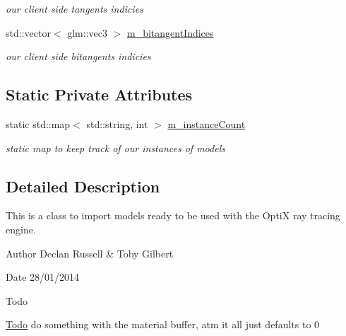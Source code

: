 \begin{DoxyCompactItemize}
\begin{DoxyCompactList}\small\item\em our client side tangents indicies \end{DoxyCompactList}\item 
\hypertarget{class_opti_x_model_a1b7e646a331010d59c0628a857b24a7b}{std\-::vector$<$ glm\-::vec3 $>$ \hyperlink{class_opti_x_model_a1b7e646a331010d59c0628a857b24a7b}{m\-\_\-bitangent\-Indices}}\label{class_opti_x_model_a1b7e646a331010d59c0628a857b24a7b}

\begin{DoxyCompactList}\small\item\em our client side bitangents indicies \end{DoxyCompactList}\end{DoxyCompactItemize}
\subsection*{Static Private Attributes}
\begin{DoxyCompactItemize}
\item 
\hypertarget{class_opti_x_model_ab64b58ae7b33fdc1f9728baeab01e11a}{static std\-::map$<$ std\-::string, int $>$ \hyperlink{class_opti_x_model_ab64b58ae7b33fdc1f9728baeab01e11a}{m\-\_\-instance\-Count}}\label{class_opti_x_model_ab64b58ae7b33fdc1f9728baeab01e11a}

\begin{DoxyCompactList}\small\item\em static map to keep track of our instances of models \end{DoxyCompactList}\end{DoxyCompactItemize}


\subsection{Detailed Description}
This is a class to import models ready to be used with the Opti\-X ray tracing engine. 

\begin{DoxyAuthor}{Author}
Declan Russell \& Toby Gilbert 
\end{DoxyAuthor}
\begin{DoxyDate}{Date}
28/01/2014 
\end{DoxyDate}
\begin{DoxyRefDesc}{Todo}
\item[\hyperlink{todo__todo000001}{Todo}]do something with the material buffer, atm it all just defaults to 0 \end{DoxyRefDesc}


